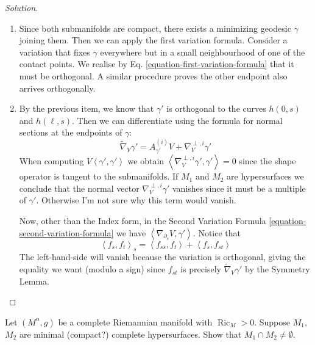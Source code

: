 \begin{proof}[Solution]
\begin{enumerate}
\item Since both submanifolds are compact, there exists a minimizing geodesic
$\gamma$ joining them. Then we can apply the first variation formula. Consider a
variation that fixes $\gamma$ everywhere but in a small neighbourhood of one of
the contact points. We realise by Eq. \ref{equation-first-variation-formula}
that it must be orthogonal. A similar procedure proves the other endpoint also
arrives orthogonally.

\item By the previous item, we
know that $\gamma'$ is orthogonal to the curves $h(0,s)$ and $h(\ell,s)$. Then
we can differentiate using the formula for normal sections at the endpoints of
$\gamma$:
$$
\tilde{\nabla}_{V}\gamma'=A^{(i)}_{\gamma'}V+\nabla^{\perp,i}_V\gamma'
$$
When computing $V\left<\gamma',\gamma'\right>$ we obtain
$\left<\nabla^{\perp,i}_V\gamma',\gamma'\right>=0$ since the shape operator is
tangent to the submanifolds. If $M_1$ and $M_2$ are hypersurfaces we conclude 
that the normal vector $\nabla^{\perp,i}_V\gamma'$ vanishes since it must be a 
multiple of $\gamma'$. Otherwise I'm not sure why this term would vanish.

Now, other than the Index form, in the Second Variation Formula
\ref{equation-second-variation-formula} we have
$\left<\nabla_{\partial_s}V,\gamma'\right>$. Notice that
$$
\left<f_s,f_t\right>_s=\left<f_{ss},f_t\right>+\left<f_s,f_{st}\right>
$$
The left-hand-side will vanish because the variation is orthogonal, giving the
equality we want (modulo a sign) since $f_{st}$ is precisely
$\tilde{\nabla}_V\gamma'$ by the Symmetry Lemma.
\end{enumerate}
\end{proof}

\begin{exercise}
\label{exercise-intersecting-minimal-hypersurfaces}
Let $(M^n,g)$ be a complete Riemannian manifold with $\operatorname{Ric}_M>0$. 
Suppose $M_1$, $M_2$ are minimal (compact?) complete hypersurfaces. Show that 
$M_1 \cap M_2 \neq \emptyset$.
\end{exercise}

